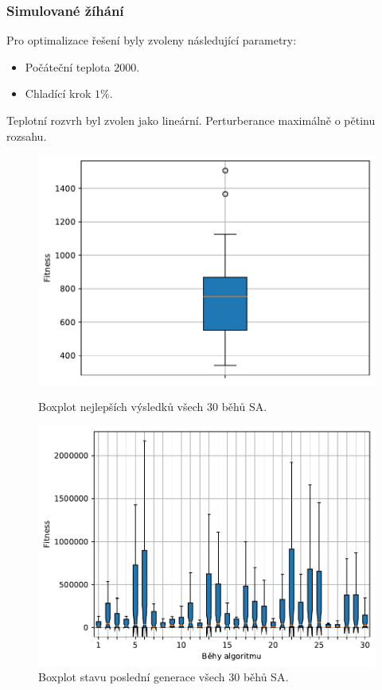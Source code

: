 \subsubsection{Simulované žíhání}
Pro optimalizace řešení byly zvoleny následující parametry:
\begin{itemize}
    \item Počáteční teplota $2000$.
    \item Chladící krok $1\%$.
\end{itemize}
Teplotní rozvrh byl zvolen jako lineární. Perturberance maximálně o pětinu rozsahu.

\begin{figure}[H]
\begin{minipage}[t]{0.475\linewidth}
\includegraphics[width=\linewidth]{obrazky-figures/statistics/Benchmarks/Rosenbrock/SA/bestsBoxplot_WithOutliers.pdf}
\caption{Boxplot nejlepších výsledků všech $30$ běhů SA.}
\label{fg:bench:rosenbrock:sa:best}
\end{minipage}
\hfill
\begin{minipage}[t]{0.475\linewidth}
\includegraphics[width=\linewidth]{obrazky-figures/statistics/Benchmarks/Rosenbrock/SA/lastGenBoxplots.pdf}
\caption{Boxplot stavu poslední generace všech $30$ běhů SA.}
\label{fg:bench:rosenbrock:sa:lastGen}
\end{minipage}
\end{figure}

